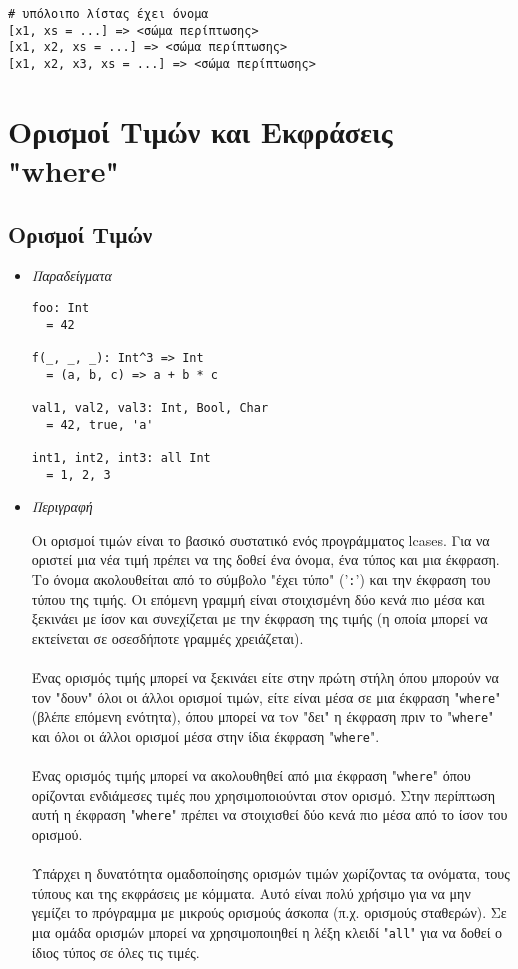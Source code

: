 \documentclass[diploma]{softlab-thesis}
\begin{document}
\begin{itemize}
\begin{verbatim}
# υπόλοιπο λίστας έχει όνομα
[x1, xs = ...] => <σώμα περίπτωσης>
[x1, x2, xs = ...] => <σώμα περίπτωσης>
[x1, x2, x3, xs = ...] => <σώμα περίπτωσης>
\end{verbatim}

\end{itemize}

\newpage
\section{Ορισμοί Τιμών και Εκφράσεις "where"}
\label{subsec:valdefswheregr}

\subsection{Ορισμοί Τιμών}

\begin{itemize}

\item \textit{Παραδείγματα}

\begin{verbatim}
foo: Int
  = 42

f(_, _, _): Int^3 => Int
  = (a, b, c) => a + b * c

val1, val2, val3: Int, Bool, Char
  = 42, true, 'a'

int1, int2, int3: all Int
  = 1, 2, 3
\end{verbatim}

\item \textit{Περιγραφή}

Οι ορισμοί τιμών είναι το βασικό συστατικό ενός προγράμματος lcases. Για να
οριστεί μια νέα τιμή πρέπει να της δοθεί ένα όνομα, ένα τύπος και μια έκφραση.
Το όνομα ακολουθείται από το σύμβολο "έχει τύπο" ('\verb|:|') και την έκφραση
του τύπου της τιμής. Οι επόμενη γραμμή είναι στοιχισμένη δύο κενά πιο μέσα
και ξεκινάει με ίσον και συνεχίζεται με την έκφραση της τιμής (η οποία μπορεί
να εκτείνεται σε οσεσδήποτε γραμμές χρειάζεται).
\\\\
Ένας ορισμός τιμής μπορεί να ξεκινάει είτε στην πρώτη στήλη όπου μπορούν να τον
"δουν" όλοι οι άλλοι ορισμοί τιμών, είτε είναι μέσα σε μια έκφραση
"\verb|where|" (βλέπε επόμενη ενότητα), όπου μπορεί να τoν "δει" η έκφραση πριν
το "\verb|where|" και όλοι οι άλλοι ορισμοί μέσα στην ίδια έκφραση
"\verb|where|".
\\\\
Ένας ορισμός τιμής μπορεί να ακολουθηθεί από μια έκφραση "\verb|where|" όπου
ορίζονται ενδιάμεσες τιμές που χρησιμοποιούνται στον ορισμό. Στην περίπτωση
αυτή η έκφραση "\verb|where|" πρέπει να στοιχισθεί δύο κενά πιο μέσα από το
ίσον του ορισμού.
\\\\
Υπάρχει η δυνατότητα ομαδοποίησης ορισμών τιμών χωρίζοντας τα ονόματα, τους
τύπους και της εκφράσεις με κόμματα. Αυτό είναι πολύ χρήσιμο για να μην
γεμίζει το πρόγραμμα με μικρούς ορισμούς άσκοπα (π.χ. ορισμούς σταθερών).
Σε μια ομάδα ορισμών μπορεί να χρησιμοποιηθεί η λέξη κλειδί "\verb|all|"
για να δοθεί ο ίδιος τύπος σε όλες τις τιμές.

\end{itemize}
\end{document}
